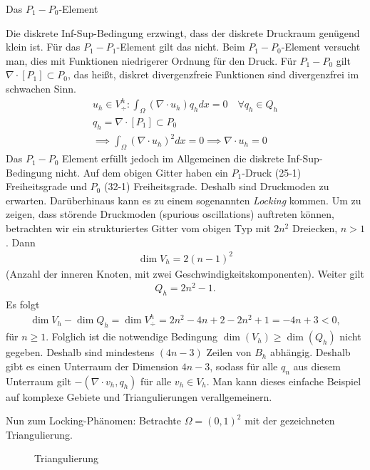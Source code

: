 \begin{beispiel} Das $P_{1}-P_{0}$-Element

Die diskrete Inf-Sup-Bedingung erzwingt, dass der diskrete Druckraum genügend klein ist. Für das $P_{1}-P_{1}$-Element gilt das nicht. Beim  $P_{1}-P_{0}$-Element versucht man, dies mit Funktionen niedrigerer Ordnung für den Druck. Für $P_{1}-P_{0}$ gilt $\nabla\cdot[P_{1}]\subset P_{0}$, das heißt, diskret divergenzfreie Funktionen sind divergenzfrei im schwachen Sinn.
\begin{align*}
  u_{h} \in V_{\div}^{h}: \int_{\Omega} (\nabla\cdot u_{h}) q_{h} dx = 0 \quad \forall q_{h} \in Q_{h}\\
q_{h} = \nabla\cdot[P_{1}] \subset P_{0}\\
\implies \int_{\Omega} (\nabla\cdot u_{h})^{2} dx = 0 \implies \nabla\cdot u_{h} = 0
\end{align*}
Das $P_{1}-P_{0}$ Element erfüllt jedoch im Allgemeinen die diskrete Inf-Sup-Bedingung nicht. Auf dem obigen Gitter haben ein $P_{1}$-Druck (25-1) Freiheitsgrade und $P_{0}$ (32-1) Freiheitsgrade. Deshalb sind Druckmoden zu erwarten. Darüberhinaus kann es zu einem sogenannten \emph{Locking} kommen. Um zu zeigen, dass störende Druckmoden (spurious oscillations) auftreten können, betrachten wir ein strukturiertes Gitter vom obigen Typ mit $2n^{2}$ Dreiecken, $n> 1$. Dann
\begin{align*}
\dim V_{h} = 2(n-1)^{2}  
\end{align*}
(Anzahl der inneren Knoten, mit zwei Geschwindigkeitskomponenten). Weiter gilt
\begin{align*}
  Q_{h} = 2n^{2} -1. 
\end{align*}
Es folgt
\begin{align*}
  \dim V_{h} - \dim Q_{h} = \dim V_{\div}^{h} = 2n^{2} - 4n + 2 - 2n^{2} + 1= -4n + 3 < 0, 
\end{align*}
für $n \geq 1$. Folglich ist die notwendige Bedingung $\dim(V_{h}) \geq \dim(Q_{h})$ nicht gegeben. Deshalb sind mindestens $(4n-3)$ Zeilen von $B_{h}$ abhängig. Deshalb gibt es einen Unterraum der Dimension $4n - 3$, sodass für alle $q_{n}$ aus diesem Unterraum gilt $- (\nabla\cdot v_{h}, q_{h})$ für alle $v_{h} \in V_{h}$. Man kann dieses einfache Beispiel auf komplexe Gebiete und Triangulierungen verallgemeinern. 
\end{beispiel}
Nun zum Locking-Phänomen:
Betrachte $\Omega = (0, 1)^{2}$ mit der gezeichneten Triangulierung.
\begin{figure}[h!]
  \centering
  \caption{Triangulierung}
  \label{fig:tri}
\end{figure}
